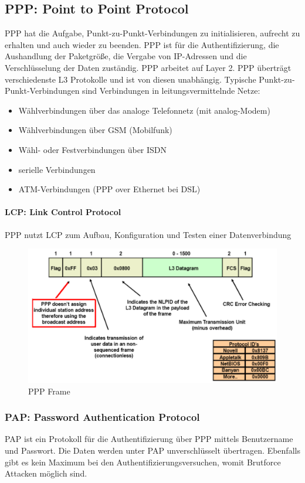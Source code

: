 \subsection{PPP: Point to Point Protocol}
PPP hat die Aufgabe, Punkt-zu-Punkt-Verbindungen zu initialisieren, aufrecht zu erhalten und auch wieder zu beenden. PPP ist für die Authentifizierung, die Aushandlung der Paketgröße, die Vergabe von IP-Adressen und die Verschlüsselung der Daten zuständig. PPP arbeitet auf Layer 2. PPP überträgt verschiedenste L3 Protokolle und ist von diesen unabhängig. Typische Punkt-zu-Punkt-Verbindungen sind Verbindungen in leitungsvermittelnde Netze:
\begin{itemize}
	\item Wählverbindungen über das analoge Telefonnetz (mit analog-Modem)
	\item Wählverbindungen über GSM (Mobilfunk)
	\item Wähl- oder Festverbindungen über ISDN
	\item serielle Verbindungen
	\item ATM-Verbindungen (PPP over Ethernet bei DSL)
\end{itemize}

\paragraph{LCP: Link Control Protocol}
PPP nutzt LCP zum Aufbau, Konfiguration und Testen einer Datenverbindung

\begin{figure}[h]
	\centering
	\includegraphics[width=0.7\linewidth]{images/ppp_frame}
	\caption{PPP Frame}
\end{figure}


\subsubsection{PAP: Password Authentication Protocol}
PAP ist ein Protokoll für die Authentifizierung über PPP mittels Benutzername und Passwort. Die Daten werden unter PAP unverschlüsselt übertragen. Ebenfalls gibt es kein Maximum bei den Authentifizierungsversuchen, womit Brutforce Attacken möglich sind.

